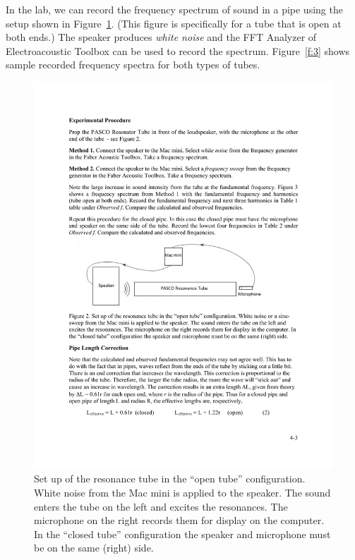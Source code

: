 \documentclass[11pt]{NSF}
\begin{document}
In the lab, we can record the frequency spectrum of sound in a pipe
using the setup shown in Figure~\ref{f:2}.
(This figure is specifically for a tube that is open at both ends.)
The speaker produces {\em white noise} and the FFT Analyzer
of Electroacoustic Toolbox can be used to record the spectrum.
Figure~\ref{f:3} shows sample recorded frequency spectra for both 
types of tubes.
%
\begin{figure}[hbtp]
\begin{center}
\includegraphics[width=.65\textwidth]{fig4_2}
\caption{Set up of the resonance tube in the ``open tube” configuration. White
noise from the Mac mini is applied to the speaker. The sound
enters the tube on the left and excites the resonances. The microphone on the
right records them for display on the computer. In the ``closed tube” 
configuration the speaker and microphone must be on the same (right) side.}
\label{f:2} 
\end{center} 
\end{figure}
%
%
\end{document}
